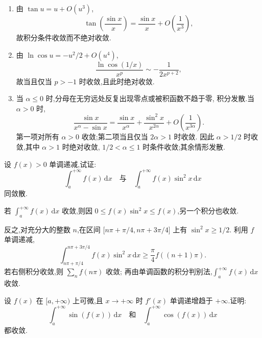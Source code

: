 \begin{solution}
  \begin{enumerate}
    \item 由 $\tan u=u+O(u^3)$,
          \[
            \tan\left(\dfrac{\sin x}{x}\right)
            =\dfrac{\sin x}{x}+O\left(\dfrac{1}{x^3}\right),
          \]
          故积分条件收敛而不绝对收敛.
    \item 由 $\ln\cos u=-u^2/2+O(u^4)$,
          \[
            \dfrac{\ln\cos(1/x)}{x^p}\sim-\dfrac{1}{2x^{p+2}},
          \]
          故当且仅当 $p>-1$ 时收敛,且此时绝对收敛.
    \item 当 $\alpha\leq0$ 时,分母在无穷远处反复出现零点或被积函数不趋于零,
          积分发散.当 $\alpha>0$ 时,
          \[
            \dfrac{\sin x}{x^\alpha-\sin x}
            =\dfrac{\sin x}{x^\alpha}+\dfrac{\sin^2x}{x^{2\alpha}}
            +O\left(\dfrac{1}{x^{3\alpha}}\right).
          \]
          第一项对所有 $\alpha>0$ 收敛;第二项当且仅当 $2\alpha>1$ 时收敛.
          因此 $\alpha>1/2$ 时收敛,其中 $\alpha>1$ 时绝对收敛,
          $1/2<\alpha\leq1$ 时条件收敛;其余情形发散.
  \end{enumerate}
\end{solution}

\begin{example}
  设 $f(x)>0$ 单调递减,试证:
  \[
    \int_a^{+\infty}f(x)\,\mathrm{d}x
    \quad\text{与}\quad
    \int_a^{+\infty}f(x)\sin^2x\,\mathrm{d}x
  \]
  同敛散.
\end{example}
\exampleblank

\begin{solution}
  若 $\displaystyle\int_a^{+\infty}f(x)\,\mathrm{d}x$ 收敛,则因
  $0\leq f(x)\sin^2x\leq f(x)$,另一个积分也收敛.

  反之,对充分大的整数 $n$,在区间
  $\lbrack n\pi+\pi/4,n\pi+3\pi/4\rbrack$ 上有 $\sin^2x\geq1/2$.
  利用 $f$ 单调递减,
  \[
    \int_{n\pi+\pi/4}^{n\pi+3\pi/4}f(x)\sin^2x\,\mathrm{d}x
    \geq\dfrac{\pi}{4}f((n+1)\pi).
  \]
  若右侧积分收敛,则 $\displaystyle\sum\limits_n f(n\pi)$ 收敛;
  再由单调函数的积分判别法,$\displaystyle\int_a^{+\infty}f(x)\,\mathrm{d}x$ 收敛.
\end{solution}

\begin{example}
  设 $f(x)$ 在 $\lbrack a,+\infty)$ 上可微,且 $x\to+\infty$ 时 $f'(x)$ 单调递增趋于 $+\infty$.证明:
  \[
    \int_a^{+\infty}\sin(f(x))\,\mathrm{d}x
    \quad\text{和}\quad
    \int_a^{+\infty}\cos(f(x))\,\mathrm{d}x
  \]
  都收敛.
\end{example}
\exampleblank

